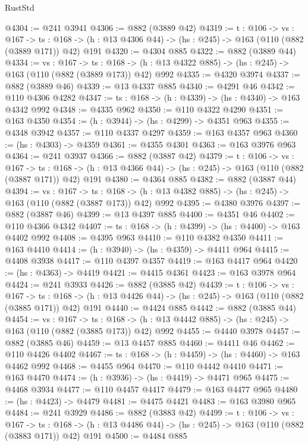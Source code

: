 \begin{lexlean}{RustStd}
\begin{coremodule}
@4304 := @241 @3941
@4306 := @882 (@3889 @42)
@4319 := {t : @106} ->
  {vs : @167} ->
  {ts : @168} -> (h : @13 @4306 @44) -> (hs : @245) -> @163 (@110 (@882 (@3889 @171)) @42) @191
@4320 := @4304 @885
@4322 := @882 (@3889 @44)
@4334 := {vs : @167} ->
  {ts : @168} -> (h : @13 @4322 @885) -> (hs : @245) -> @163 (@110 (@882 (@3889 @173)) @42) @992
@4335 := @4320 @3974
@4337 := @882 (@3889 @46)
@4339 := @13 @4337 @885
@4340 := @4291 @46
@4342 := @110 @4306 @4282
@4347 := {ts : @168} -> (h : @4339) -> (hs : @4340) -> @163 @4342 @992
@4348 := @4335 @962
@4350 := @110 @4322 @4290
@4351 := @163 @4350
@4354 := (h : @3944) -> (hs : @4299) -> @4351 @963
@4355 := @4348 @3942
@4357 := @110 @4337 @4297
@4359 := @163 @4357 @963
@4360 := (hs : @4303) -> @4359
@4361 := @4355 @4301
@4363 := @163 @3976 @963
@4364 := @241 @3937
@4366 := @882 (@3887 @42)
@4379 := {t : @106} ->
  {vs : @167} ->
  {ts : @168} -> (h : @13 @4366 @44) -> (hs : @245) -> @163 (@110 (@882 (@3887 @171)) @42) @191
@4380 := @4364 @885
@4382 := @882 (@3887 @44)
@4394 := {vs : @167} ->
  {ts : @168} -> (h : @13 @4382 @885) -> (hs : @245) -> @163 (@110 (@882 (@3887 @173)) @42) @992
@4395 := @4380 @3976
@4397 := @882 (@3887 @46)
@4399 := @13 @4397 @885
@4400 := @4351 @46
@4402 := @110 @4366 @4342
@4407 := {ts : @168} -> (h : @4399) -> (hs : @4400) -> @163 @4402 @992
@4408 := @4395 @963
@4410 := @110 @4382 @4350
@4411 := @163 @4410
@4414 := (h : @3940) -> (hs : @4359) -> @4411 @964
@4415 := @4408 @3938
@4417 := @110 @4397 @4357
@4419 := @163 @4417 @964
@4420 := (hs : @4363) -> @4419
@4421 := @4415 @4361
@4423 := @163 @3978 @964
@4424 := @241 @3933
@4426 := @882 (@3885 @42)
@4439 := {t : @106} ->
  {vs : @167} ->
  {ts : @168} -> (h : @13 @4426 @44) -> (hs : @245) -> @163 (@110 (@882 (@3885 @171)) @42) @191
@4440 := @4424 @885
@4442 := @882 (@3885 @44)
@4454 := {vs : @167} ->
  {ts : @168} -> (h : @13 @4442 @885) -> (hs : @245) -> @163 (@110 (@882 (@3885 @173)) @42) @992
@4455 := @4440 @3978
@4457 := @882 (@3885 @46)
@4459 := @13 @4457 @885
@4460 := @4411 @46
@4462 := @110 @4426 @4402
@4467 := {ts : @168} -> (h : @4459) -> (hs : @4460) -> @163 @4462 @992
@4468 := @4455 @964
@4470 := @110 @4442 @4410
@4471 := @163 @4470
@4474 := (h : @3936) -> (hs : @4419) -> @4471 @965
@4475 := @4468 @3934
@4477 := @110 @4457 @4417
@4479 := @163 @4477 @965
@4480 := (hs : @4423) -> @4479
@4481 := @4475 @4421
@4483 := @163 @3980 @965
@4484 := @241 @3929
@4486 := @882 (@3883 @42)
@4499 := {t : @106} ->
  {vs : @167} ->
  {ts : @168} -> (h : @13 @4486 @44) -> (hs : @245) -> @163 (@110 (@882 (@3883 @171)) @42) @191
@4500 := @4484 @885

\end{coremodule}
\end{lexlean}
